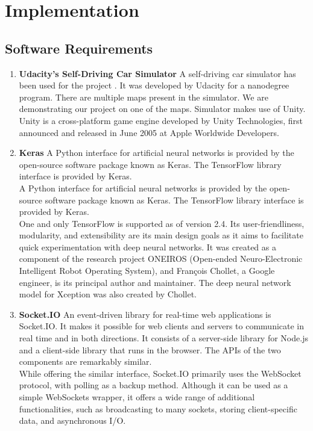 \documentclass[ 12pt,a4paper,twocolumn,fleqn]{article}
\begin{document}
\section{Implementation}
\subsection{Software Requirements}
\begin{enumerate}
    \item \textbf{Udacity's Self-Driving Car Simulator}
    A self-driving car simulator has been used for the project .  It was developed by Udacity for a nanodegree program. There are multiple maps present in the simulator. We are demonstrating our project on one of the maps. Simulator makes use of Unity.\\
    Unity is a cross-platform game engine developed by Unity Technologies, first announced and released in June 2005 at Apple Worldwide Developers. 
    \item \textbf{Keras} 
    A Python interface for artificial neural networks is provided by the open-source software package known as Keras. The TensorFlow library interface is provided by Keras.\\
    A Python interface for artificial neural networks is provided by the open-source software package known as Keras. The TensorFlow library interface is provided by Keras.\\
    One and only TensorFlow is supported as of version 2.4. Its user-friendliness, modularity, and extensibility are its main design goals as it aims to facilitate quick experimentation with deep neural networks. It was created as a component of the research project ONEIROS (Open-ended Neuro-Electronic Intelligent Robot Operating System), and François Chollet, a Google engineer, is its principal author and maintainer. The deep neural network model for Xception was also created by Chollet.\\
    \item \textbf{Socket.IO}
    An event-driven library for real-time web applications is Socket.IO. It makes it possible for web clients and servers to communicate in real time and in both directions. It consists of a server-side library for Node.js and a client-side library that runs in the browser. The APIs of the two components are remarkably similar.\\
    While offering the similar interface, Socket.IO primarily uses the WebSocket protocol, with polling as a backup method. Although it can be used as a simple WebSockets wrapper, it offers a wide range of additional functionalities, such as broadcasting to many sockets, storing client-specific data, and asynchronous I/O.\\

\end{enumerate}
\end{document}
